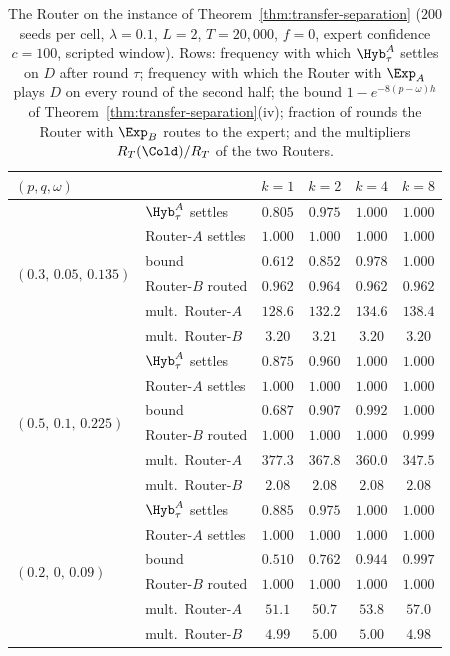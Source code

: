 \begin{table}[h]
\centering
\caption{The Router on the instance of Theorem~\ref{thm:transfer-separation} ($200$ seeds per cell, $\lambda=0.1$, $L=2$, $T=20{,}000$, $f=0$, expert confidence $c=100$, scripted window). Rows: frequency with which $\Hyb^A_\tau$ settles on $D$ after round $\tau$; frequency with which the Router with $\Exp_A$ plays $D$ on every round of the second half; the bound $1-e^{-8(p-\omega)h}$ of Theorem~\ref{thm:transfer-separation}(iv); fraction of rounds the Router with $\Exp_B$ routes to the expert; and the multipliers $R_T(\Cold)/R_T$ of the two Routers.}
\label{tab:router-check}
\small
\begin{tabular}{@{}llcccc@{}}
\toprule
$(p,q,\omega)$ & & $k=1$ & $k=2$ & $k=4$ & $k=8$ \\
\midrule
\multirow{6}{*}{$(0.3,\,0.05,\,0.135)$} & $\Hyb^A_\tau$ settles & $0.805$ & $0.975$ & $1.000$ & $1.000$ \\
 & Router-$A$ settles & $1.000$ & $1.000$ & $1.000$ & $1.000$ \\
 & bound & $0.612$ & $0.852$ & $0.978$ & $1.000$ \\
 & Router-$B$ routed & $0.962$ & $0.964$ & $0.962$ & $0.962$ \\
 & mult.\ Router-$A$ & $128.6$ & $132.2$ & $134.6$ & $138.4$ \\
 & mult.\ Router-$B$ & $3.20$ & $3.21$ & $3.20$ & $3.20$ \\
\midrule
\multirow{6}{*}{$(0.5,\,0.1,\,0.225)$} & $\Hyb^A_\tau$ settles & $0.875$ & $0.960$ & $1.000$ & $1.000$ \\
 & Router-$A$ settles & $1.000$ & $1.000$ & $1.000$ & $1.000$ \\
 & bound & $0.687$ & $0.907$ & $0.992$ & $1.000$ \\
 & Router-$B$ routed & $1.000$ & $1.000$ & $1.000$ & $0.999$ \\
 & mult.\ Router-$A$ & $377.3$ & $367.8$ & $360.0$ & $347.5$ \\
 & mult.\ Router-$B$ & $2.08$ & $2.08$ & $2.08$ & $2.08$ \\
\midrule
\multirow{6}{*}{$(0.2,\,0,\,0.09)$} & $\Hyb^A_\tau$ settles & $0.885$ & $0.975$ & $1.000$ & $1.000$ \\
 & Router-$A$ settles & $1.000$ & $1.000$ & $1.000$ & $1.000$ \\
 & bound & $0.510$ & $0.762$ & $0.944$ & $0.997$ \\
 & Router-$B$ routed & $1.000$ & $1.000$ & $1.000$ & $1.000$ \\
 & mult.\ Router-$A$ & $51.1$ & $50.7$ & $53.8$ & $57.0$ \\
 & mult.\ Router-$B$ & $4.99$ & $5.00$ & $5.00$ & $4.98$ \\
\bottomrule
\end{tabular}
\end{table}


